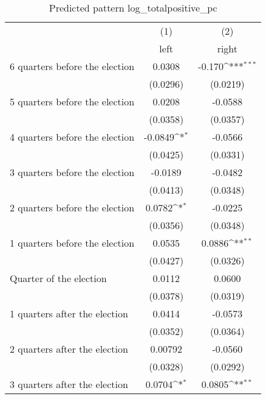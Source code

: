 \begin{table}[htbp]\centering
\def\sym#1{\ifmmode^{#1}\else\(^{#1}\)\fi}
\caption{Predicted pattern log\_totalpositive\_pc}
\begin{tabular}{l*{2}{c}}
\hline\hline
                    &\multicolumn{1}{c}{(1)}&\multicolumn{1}{c}{(2)}\\
                    &\multicolumn{1}{c}{left}&\multicolumn{1}{c}{right}\\
\hline
 6 quarters before the election&      0.0308         &      -0.170\sym{***}\\
                    &    (0.0296)         &    (0.0219)         \\
[1em]
 5 quarters before the election&      0.0208         &     -0.0588         \\
                    &    (0.0358)         &    (0.0357)         \\
[1em]
 4 quarters before the election&     -0.0849\sym{*}  &     -0.0566         \\
                    &    (0.0425)         &    (0.0331)         \\
[1em]
 3 quarters before the election&     -0.0189         &     -0.0482         \\
                    &    (0.0413)         &    (0.0348)         \\
[1em]
 2 quarters before the election&      0.0782\sym{*}  &     -0.0225         \\
                    &    (0.0356)         &    (0.0348)         \\
[1em]
 1 quarters before the election&      0.0535         &      0.0886\sym{**} \\
                    &    (0.0427)         &    (0.0326)         \\
[1em]
Quarter of the election&      0.0112         &      0.0600         \\
                    &    (0.0378)         &    (0.0319)         \\
[1em]
 1 quarters after the election&      0.0414         &     -0.0573         \\
                    &    (0.0352)         &    (0.0364)         \\
[1em]
 2 quarters after the election&     0.00792         &     -0.0560         \\
                    &    (0.0328)         &    (0.0292)         \\
[1em]
 3 quarters after the election&      0.0704\sym{*}  &      0.0805\sym{**} \\

\end{tabular}
\end{table}
